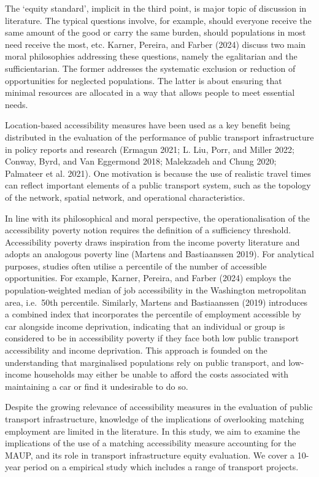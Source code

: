 \documentclass{article}
\begin{document}
The `equity standard', implicit in the third point, is major topic of
discussion in literature. The typical questions involve, for example,
should everyone receive the same amount of the good or carry the same
burden, should populations in most need receive the most, etc. Karner,
Pereira, and Farber (2024) discuss two main moral philosophies
addressing these questions, namely the egalitarian and the
sufficientarian. The former addresses the systematic exclusion or
reduction of opportunities for neglected populations. The latter is
about ensuring that minimal resources are allocated in a way that allows
people to meet essential needs.

Location-based accessibility measures have been used as a key benefit
being distributed in the evaluation of the performance of public
transport infrastructure in policy reports and research (Ermagun 2021;
L. Liu, Porr, and Miller 2022; Conway, Byrd, and Van Eggermond 2018;
Malekzadeh and Chung 2020; Palmateer et al. 2021). One motivation is
because the use of realistic travel times can reflect important elements
of a public transport system, such as the topology of the network,
spatial network, and operational characteristics.

In line with its philosophical and moral perspective, the
operationalisation of the accessibility poverty notion requires the
definition of a sufficiency threshold. Accessibility poverty draws
inspiration from the income poverty literature and adopts an analogous
poverty line (Martens and Bastiaanssen 2019). For analytical purposes,
studies often utilise a percentile of the number of accessible
opportunities. For example, Karner, Pereira, and Farber (2024) employs
the population-weighted median of job accessibility in the Washington
metropolitan area, i.e.~50th percentile. Similarly, Martens and
Bastiaanssen (2019) introduces a combined index that incorporates the
percentile of employment accessible by car alongside income deprivation,
indicating that an individual or group is considered to be in
accessibility poverty if they face both low public transport
accessibility and income deprivation. This approach is founded on the
understanding that marginalised populations rely on public transport,
and low-income households may either be unable to afford the costs
associated with maintaining a car or find it undesirable to do so.

Despite the growing relevance of accessibility measures in the
evaluation of public transport infrastructure, knowledge of the
implications of overlooking matching employment are limited in the
literature. In this study, we aim to examine the implications of the use
of a matching accessibility measure accounting for the MAUP, and its
role in transport infrastructure equity evaluation. We cover a 10-year
period on a empirical study which includes a range of transport
projects.
\end{document}
